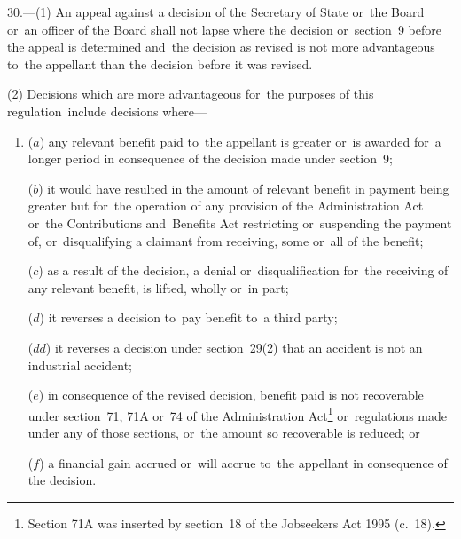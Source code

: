 \documentclass[12pt,a4paper]{article}
\begin{document}
30.—(1) An appeal against a decision of the Secretary of State%
or~the Board or~an officer of the Board  %
shall not lapse where the decision 
%
%
or~section~9 before the appeal is determined and~the decision as 
%
revised is not more advantageous to~the appellant than the decision before it was 
%
revised.

(2) Decisions which are more advantageous for~the purposes of this regulation~include decisions where—
\begin{enumerate}\item[]
($a$) any relevant benefit paid to~the appellant is greater or~is awarded for~a longer period in consequence of the decision made under section~9;

($b$) it would have resulted in the amount of relevant benefit in payment being greater but for~the operation of any provision of the Administration Act or~the Contributions and~Benefits Act restricting or~suspending the payment of, or~disqualifying a claimant from receiving, some or~all of the benefit;

($c$) as a result of the decision, a denial or~disqualification for~the receiving of any relevant benefit, is lifted, wholly or~in part;

($d$) it reverses a decision to~pay benefit to~a third party;

($dd$) it reverses a decision under section~29(2) that an accident is not an industrial accident;

($e$) in consequence of the revised decision, benefit paid is not recoverable under section~71, 71A or~74 of the Administration Act\footnote{\frenchspacing Section 71A was inserted by section~18 of the Jobseekers Act 1995 (c.~18).} or~regulations made under any of those sections, or~the amount so recoverable is reduced; or

($f$) a financial gain accrued or~will accrue to~the appellant in consequence of the decision.
\end{enumerate}
\end{document}
